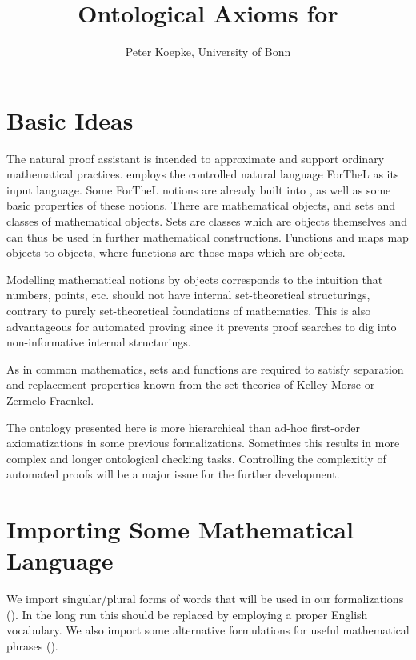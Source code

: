 \documentclass[11pt]{article}
\author{Peter Koepke, University of Bonn}
\title{Ontological Axioms for \Naproche}
\begin{document}
\maketitle

\section{Basic Ideas}

The natural proof assistant \Naproche is intended to
approximate and support ordinary mathematical practices.
\Naproche employs the controlled natural language ForTheL
as its input language. Some ForTheL notions are already
built into \Naproche, as well as some basic properties of
these notions.
There are
mathematical objects, and sets and classes of mathematical
objects. Sets are classes which are objects themselves and
can thus be used in further mathematical constructions. Functions
and maps map objects to objects, where functions are those
maps which are objects.

Modelling mathematical notions by objects corresponds
to the intuition that numbers, points, etc. should
not have internal set-theoretical
structurings, contrary to purely set-theoretical
foundations of mathematics. This is also advantageous
for automated proving since it prevents proof searches to
dig into non-informative internal structurings.

As in common mathematics, sets and functions are required to
satisfy separation and replacement properties known from the
set theories of Kelley-Morse or Zermelo-Fraenkel.

The ontology presented here is more hierarchical than
ad-hoc first-order axiomatizations in some previous
\Naproche formalizations. Sometimes
this results in more complex and longer ontological checking tasks.
Controlling the complexitiy of automated proofs will be a major
issue for the further development.


\section{Importing Some Mathematical Language}

We import singular/plural forms of words that will be used in
our formalizations ().
In the long run this should be replaced by
employing a proper English vocabulary. We also
import some alternative formulations for
useful mathematical phrases ().
\end{document}
